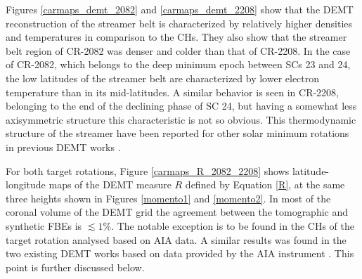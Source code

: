 \documentclass[namedreferences]{solarphysics}
\begin{document}
\begin{article}
{{Figures \ref{carmaps_demt_2082} and \ref{carmaps_demt_2208} show that} the DEMT reconstruction of the streamer belt is characterized by relatively higher densities and temperatures in comparison to the CHs. They also show that the streamer belt region of CR-2082 was denser and colder than  that of CR-2208.} In the case of CR-2082, which belongs to the deep minimum epoch between {SCs 23 and 24}, the {low latitudes of the streamer belt are characterized by lower electron temperature than in its mid-latitudes.} A similar behavior is seen in CR-2208, belonging to the {end of the declining} phase of {SC 24}, but having a {somewhat less axisymmetric} structure this characteristic is not so obvious. This thermodynamic structure of the streamer have been reported for other solar minimum rotations in previous DEMT works \citep{lloveras_2017,nuevo_2013,vasquez_2010}.

{For both target rotations, Figure \ref{carmaps_R_2082_2208} shows {latitude-longitude} maps of {the DEMT} measure $R$ defined by Equation \ref{R}, at the same three heights shown in Figures \ref{momento1} and \ref{momento2}. In most of the coronal volume of the DEMT grid the agreement between the tomographic and synthetic FBEs is $\lesssim 1\%$. The notable exception is to be found in the CHs of the target rotation {analysed} based on AIA data. A similar results was found in the two existing DEMT works based on data provided by the AIA instrument \citep{nuevo_2015,maccormack_2017}. This point is further discussed below.}


\end{article}
\end{document}

